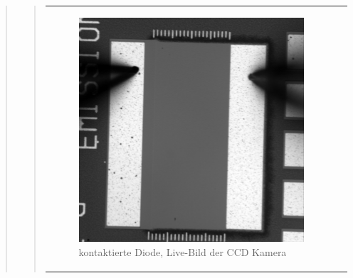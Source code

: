 \begin{quote}
\begin{quote}
         \begin{center}
                \begin{tabular}{ll}

                \hspace{-10em}
                    \begin{minipage}{0.6\textwidth}

                        \begin{figure}[H]
                            \label{fig:rtaretewtrwer}
                            \includegraphics[scale=0.25, trim = 0cm 0cm 0cm
                            0cm,
                            clip]{./Emissionsbilder/drei/nach_Kontaktierung.png}
                            \caption{kontaktierte Diode, Live-Bild der CCD
                            Kamera}
                        \end{figure}

                    \end{minipage}
                    \begin{minipage}{0.6\textwidth}


\end{minipage}
\end{tabular}
\end{center}
\end{quote}
\end{quote}
